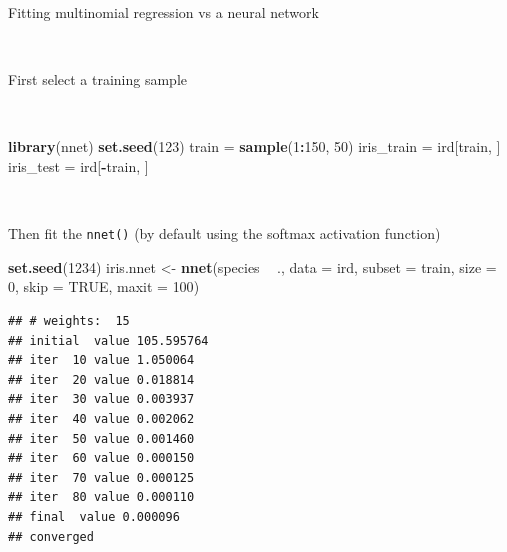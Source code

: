 \documentclass[10pt,ignorenonframetext,]{beamer}
\newenvironment{Shaded}{\begin{snugshade}}{\end{snugshade}}
\newcommand{\DataTypeTok}[1]{\textcolor[rgb]{0.13,0.29,0.53}{#1}}
\newcommand{\DecValTok}[1]{\textcolor[rgb]{0.00,0.00,0.81}{#1}}
\newcommand{\KeywordTok}[1]{\textcolor[rgb]{0.13,0.29,0.53}{\textbf{#1}}}
\newcommand{\NormalTok}[1]{#1}
\newcommand{\OperatorTok}[1]{\textcolor[rgb]{0.81,0.36,0.00}{\textbf{#1}}}
\newcommand{\OtherTok}[1]{\textcolor[rgb]{0.56,0.35,0.01}{#1}}
\newcommand{\StringTok}[1]{\textcolor[rgb]{0.31,0.60,0.02}{#1}}
\begin{document}
\begin{frame}[fragile]

\begin{block}{Fitting multinomial regression vs a neural network}

\(~\)

First select a training sample

\scriptsize

\(~\)

\begin{Shaded}
\begin{Highlighting}[]
\KeywordTok{library}\NormalTok{(nnet)}
\KeywordTok{set.seed}\NormalTok{(}\DecValTok{123}\NormalTok{)}
\NormalTok{train =}\StringTok{ }\KeywordTok{sample}\NormalTok{(}\DecValTok{1}\OperatorTok{:}\DecValTok{150}\NormalTok{, }\DecValTok{50}\NormalTok{)}
\NormalTok{iris_train =}\StringTok{ }\NormalTok{ird[train, ]}
\NormalTok{iris_test =}\StringTok{ }\NormalTok{ird[}\OperatorTok{-}\NormalTok{train, ]}
\end{Highlighting}
\end{Shaded}

\(~\)

\normalsize

Then fit the \texttt{nnet()} (by default using the softmax activation
function)

\scriptsize

\begin{Shaded}
\begin{Highlighting}[]
\KeywordTok{set.seed}\NormalTok{(}\DecValTok{1234}\NormalTok{)}
\NormalTok{iris.nnet <-}\StringTok{ }\KeywordTok{nnet}\NormalTok{(species }\OperatorTok{~}\StringTok{ }\NormalTok{., }\DataTypeTok{data =}\NormalTok{ ird, }\DataTypeTok{subset =}\NormalTok{ train, }\DataTypeTok{size =} \DecValTok{0}\NormalTok{, }
    \DataTypeTok{skip =} \OtherTok{TRUE}\NormalTok{, }\DataTypeTok{maxit =} \DecValTok{100}\NormalTok{)}
\end{Highlighting}
\end{Shaded}

\begin{verbatim}
## # weights:  15
## initial  value 105.595764 
## iter  10 value 1.050064
## iter  20 value 0.018814
## iter  30 value 0.003937
## iter  40 value 0.002062
## iter  50 value 0.001460
## iter  60 value 0.000150
## iter  70 value 0.000125
## iter  80 value 0.000110
## final  value 0.000096 
## converged
\end{verbatim}

\end{block}

\end{frame}
\end{document}
